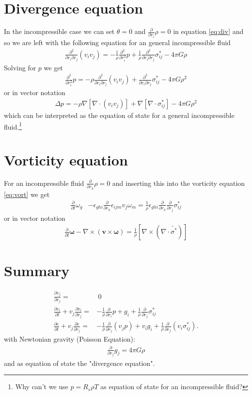 \documentclass[a4paper,
					12pt,
					twoside,
					pagesize,
					cleardoubleplain,
					headsepline,
					bibtotoc
					]{scrbook}
\renewcommand{\vec}[1]{\boldsymbol{#1}}
\newcommand{\lrb}[1]{{ \left[ #1 \right] }}
\newcommand{\pd}[1]{\frac{\partial}{\partial #1}}
\newcommand{\ppd}[2]{\frac{\partial #2}{\partial #1}}
\newcommand{\pdd}[1]{\frac{\partial^2}{\partial #1^2}}
\begin{document}
\section{Divergence equation}
In the incompressible case we can set $\theta=0$ and $\pd{r_i}\rho=0$ in
equation \eqref{eq:div} and so we are left with the following equation for an
general incompressible fluid
\begin{align}
\frac{\partial^2}{\partial r_i \partial r_j}(v_i v_j) = 
-\frac{1}{\rho}\pdd{r_i}p 
+\frac{1}{\rho}\frac{\partial^2}{\partial r_i \partial r_j}\sigma^*_{ij} 
- 4\pi G \rho
\end{align}
Solving for $p$ we get
\begin{align}
\pdd{r_i}p= 
-\rho \frac{\partial^2}{\partial r_i \partial r_j}(v_i v_j)
+\frac{\partial^2}{\partial r_i \partial r_j}\sigma^*_{ij} 
-4\pi G \rho^2
\end{align}
or in vector notation
\begin{align}
\Delta p = 
-\rho \nabla\lrb{\nabla\cdot(v_i v_j)} 
+\nabla\lrb{\nabla\cdot \sigma^*_{ij}}
- 4\pi G \rho^2
\end{align}
which can be interpreted as the equation of state for a general
incompressible fluid.\footnote{Why can't we use $p=R_s \rho T$ as equation of
state for an incompressible fluid?} 

\section{Vorticity equation}
For an incompressible fluid $\pd{r_h}\rho = 0$ and inserting this into
the vorticity equation \eqref{eq:vort} we get
\begin{align}
\pd{t}\omega_g
&-\epsilon_{ghi}\pd{r_h} \epsilon_{ijm} v_j \omega_m =
\frac{1}{\rho}\epsilon_{ghi}\pd{r_h}\pd{r_j}\sigma^*_{ij}
\end{align}
or in vector notation
\begin{align}
\pd{t} \vec{\omega}-\nabla \times (\vec{v} \times \vec{\omega}) = 
\frac{1}{\rho} \lrb{\nabla \times (\nabla \cdot \tilde{\sigma^*})}
\end{align}

\section{Summary}
\begin{align}
\ppd{r_j}{v_j} =&\ 0 \label{eq:icmass}\\
\ppd{t}{v_i} + v_j \ppd{r_j}{v_i} =& -\frac{1}{\rho}\pd{r_i}p + g_i
+\frac{1}{\rho}\pd{r_j}\sigma^*_{ij}\label{eq:icmom}\\
\ppd{t}{e} + v_j \ppd{r_j}{e} =& -\frac{1}{\rho} \pd{r_j}(v_j p) + v_i g_i
+\frac{1}{\rho}\pd{r_j}(v_i \sigma^*_{ij}).\label{eq:icetot}
\end{align}
with Newtonian gravity (Poisson Equation):
\begin{align}
\pd{r_j}g_j=4\pi G \rho
\end{align}
and as equation of state the "divergence equation".
\end{document}
